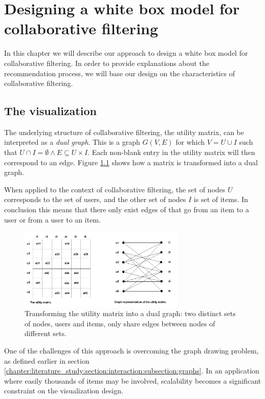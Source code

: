 \chapter{Designing a white box model for collaborative filtering}\label{chapter:whitebox}

In this chapter we will describe our approach to design a white box model for collaborative filtering. In order to provide explanations about the recommendation process, we will base our design on the characteristics of collaborative filtering.

\section{The visualization}\label{chapter:whitebox:section:visualization}

The underlying structure of collaborative filtering, the utility matrix, can be interpreted as a \emph{dual graph}. This is a graph $G(V,E)$ for which $V = U \cup I$ such that $U \cap I = \emptyset \wedge E \subseteq U \times I$\cite{dekimpe:2007}. Each non-blank entry in the utility matrix will then correspond to an edge. Figure \ref{figure:dualgraph} shows how a matrix is transformed into a dual graph.

When applied to the context of collaborative filtering, the set of nodes $U$ corresponds to the set of users, and the other set of nodes $I$ is set of items. In conclusion this means that there only exist edges of that go from an item to a user or from a user to an item.

\begin{figure}%
	\begin{center}
		\includegraphics[width=300px]{img/dualgraph}
	\end{center}
	\caption{Transforming the utility matrix into a dual graph: two distinct sets of nodes, users and items, only share edges between nodes of different sets.}%
	\label{figure:dualgraph}%
\end{figure}

One of the challenges of this approach is overcoming the graph drawing problem, as defined earlier in section \ref{chapter:literature_study:section:interaction:subsection:graphs}. In an application where easily thousands of items may be involved, scalability becomes a significant constraint on the visualization design\cite{herman:2000}.

